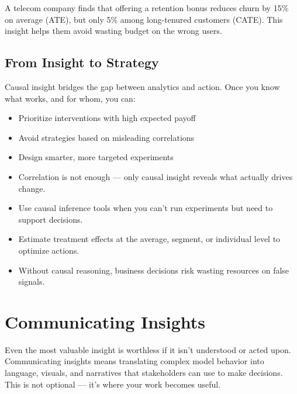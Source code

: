 \documentclass[12pt,openany]{book}
\begin{document}
\begin{examplebox}
A telecom company finds that offering a retention bonus reduces churn by 15\% on average (ATE), but only 5\% among long-tenured customers (CATE). This insight helps them avoid wasting budget on the wrong users.
\end{examplebox}

\section{From Insight to Strategy}

Causal insight bridges the gap between analytics and action. Once you know what works, and for whom, you can:
\begin{itemize}
  \item Prioritize interventions with high expected payoff
  \item Avoid strategies based on misleading correlations
  \item Design smarter, more targeted experiments
\end{itemize}

\begin{summarybox}
\begin{itemize}
  \item Correlation is not enough — only causal insight reveals what actually drives change.
  \item Use causal inference tools when you can’t run experiments but need to support decisions.
  \item Estimate treatment effects at the average, segment, or individual level to optimize actions.
  \item Without causal reasoning, business decisions risk wasting resources on false signals.
\end{itemize}
\end{summarybox}




\chapter{Communicating Insights}

Even the most valuable insight is worthless if it isn’t understood or acted upon. Communicating insights means translating complex model behavior into language, visuals, and narratives that stakeholders can use to make decisions. This is not optional — it’s where your work becomes useful.
\end{document}
